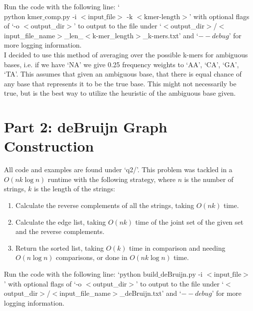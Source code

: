 \documentclass[10pt]{article}
\begin{document}
Run the code with the following line: `$\text{python kmer\_comp.py -i }<\text{input\_file}>\text{ -k }<\text{kmer-length}>$' with optional flags of `-o $<$output\_dir$>$' to output to the file under `$<$output\_dir$>$/$<$input\_file\_name$>$\_len\_$<$k-mer\_length$>$\_k-mers.txt' and `$--debug$' for more logging information.\\

I decided to use this method of averaging over the possible k-mers for ambiguous bases, i.e. if we have `NA' we give 0.25 frequency weights to `AA', `CA', `GA', `TA'. This assumes that given an ambiguous base, that there is equal chance of any base that represents it to be the true base. This might not necessarily be true, but is the best way to utilize the heuristic of the ambiguous base given.

\section*{Part 2: deBruijn Graph Construction}
All code and examples are found under `q2/'. This problem was tackled in a $O(nk \log n)$ runtime with the following strategy, where $n$ is the number of strings, $k$ is the length of the strings:
\begin{enumerate}
  \item Calculate the reverse complements of all the strings, taking $O(nk)$ time.
  \item Calculate the edge list, taking $O(nk)$ time of the joint set of the given set and the reverse complements.
  \item Return the sorted list, taking $O(k)$ time in comparison and needing $O(n \log n)$ comparisons, or done in $O(n k \log n)$ time.
\end{enumerate}

Run the code with the following line: `$\text{python build\_deBruijn.py -i }<\text{input\_file}>$' with optional flags of `-o $<$output\_dir$>$' to output to the file under `$<$output\_dir$>$/$<$input\_file\_name$>$\_deBruijn.txt' and `$--debug$' for more logging information.
\end{document}
